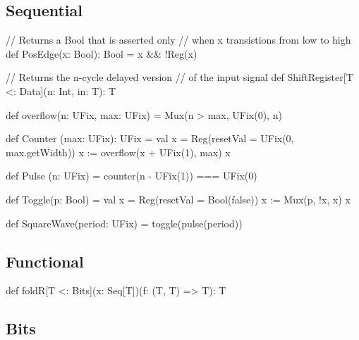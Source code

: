 \documentclass[10pt,twocolumn]{article}
\begin{document}
\subsection{Sequential}

\begin{scala}
// Returns a Bool that is asserted only 
// when x transistions from low to high
def PosEdge(x: Bool): Bool = 
  x && !Reg(x)

// Returns the n-cycle delayed version 
// of the input signal
def ShiftRegister[T <: Data](n: Int, in: T): T

def overflow(n: UFix, max: UFix) =
  Mux(n > max, UFix(0), n)

def Counter (max: UFix): UFix = {
  val x = Reg(resetVal = UFix(0, max.getWidth))
  x := overflow(x + UFix(1), max)
  x
}

def Pulse (n: UFix) =
  counter(n - UFix(1)) === UFix(0)

def Toggle(p: Bool) = {
  val x = Reg(resetVal = Bool(false))
  x := Mux(p, !x, x)
  x
}

def SquareWave(period: UFix) =
  toggle(pulse(period))
\end{scala}

\subsection{Functional}


\begin{scala}
def foldR[T <: Bits](x: Seq[T])(f: (T, T) => T): T
\end{scala}

\subsection{Bits}
\end{document}
